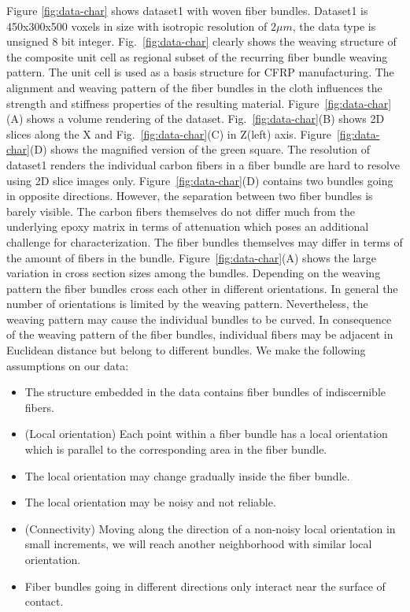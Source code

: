 Figure \ref{fig:data-char} shows dataset1 with woven fiber bundles. Dataset1 is 450x300x500 voxels in size with isotropic resolution of $2\mu m$, the data type is unsigned 8 bit integer. Fig.~\ref{fig:data-char} clearly shows the weaving structure of the composite unit cell as regional subset of the recurring fiber bundle weaving pattern. The unit cell is used as a basis structure for CFRP manufacturing. The alignment and weaving pattern of the fiber bundles in the cloth influences the strength and stiffness properties of the resulting material. Figure~\ref{fig:data-char}(A) shows a volume rendering of the dataset. Fig.~\ref{fig:data-char}(B) shows 2D slices along the X and Fig.~\ref{fig:data-char}(C) in Z(left) axis. Figure~\ref{fig:data-char}(D) shows the magnified version of the green square. 
The resolution of dataset1 renders the individual carbon fibers in a fiber bundle are hard to resolve using 2D slice images only. Figure~\ref{fig:data-char}(D) contains two bundles going in opposite directions. However, the separation between two fiber bundles is barely visible. The carbon fibers themselves do not differ much from the underlying epoxy matrix in terms of attenuation which poses an additional challenge for characterization. The fiber bundles themselves may differ in terms of the amount of fibers in the bundle. Figure~\ref{fig:data-char}(A) shows the large variation in cross section sizes among the bundles.
Depending on the weaving pattern the fiber bundles cross each other in different orientations. In general the number of orientations is limited by the weaving pattern. Nevertheless, the weaving pattern may cause the individual bundles to be curved. In consequence of the weaving pattern of the fiber bundles, individual fibers may be adjacent in Euclidean distance but belong to different bundles. 
We make the following assumptions on our data:
\begin{itemize}
\item The structure embedded in the data contains fiber bundles of indiscernible fibers.
\item (Local orientation) Each point within a fiber bundle has a local orientation which is parallel to the corresponding area in the fiber bundle.
\item The local orientation may change gradually inside the fiber bundle.
\item The local orientation may be noisy and not reliable.
\item (Connectivity) Moving along the direction of a non-noisy local orientation in small increments, we will reach another neighborhood with similar local orientation.
\item Fiber bundles going in different directions only interact near the surface of contact.
\end{itemize}
